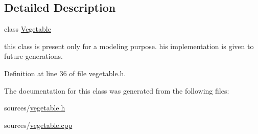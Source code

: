 \subsection{Detailed Description}
class \hyperlink{classVegetable}{Vegetable} 

this class is present only for a modeling purpose. his implementation is given to future generations. 

Definition at line 36 of file vegetable.h.



The documentation for this class was generated from the following files:\begin{DoxyCompactItemize}
\item 
sources/\hyperlink{vegetable_8h}{vegetable.h}\item 
sources/\hyperlink{vegetable_8cpp}{vegetable.cpp}\end{DoxyCompactItemize}

